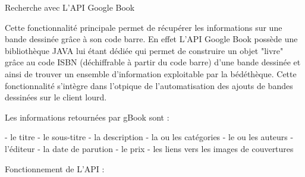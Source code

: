 Recherche avec L'API Google Book

Cette fonctionnalité principale permet de récupérer les informations sur une
bande dessinée grâce à son code barre. En effet L'API Google Book possède une
bibliothèque JAVA lui étant dédiée qui permet de construire un objet "livre"
grâce au code ISBN (déchiffrable à partir du code barre) d'une bande dessinée
et ainsi de trouver un ensemble d'information exploitable par la bédéthèque.
Cette fonctionnalité s'intègre dans l'otpique de l'automatisation des ajouts de
bandes dessinées sur le client lourd.

Les informations retournées par gBook sont :

  - le titre
  - le sous-titre
  - la description
  - la ou les catégories
  - le ou les auteurs
  - l'éditeur
  - la date de parution
  - le prix
  - les liens vers les images de couvertures

Fonctionnement de L'API : 